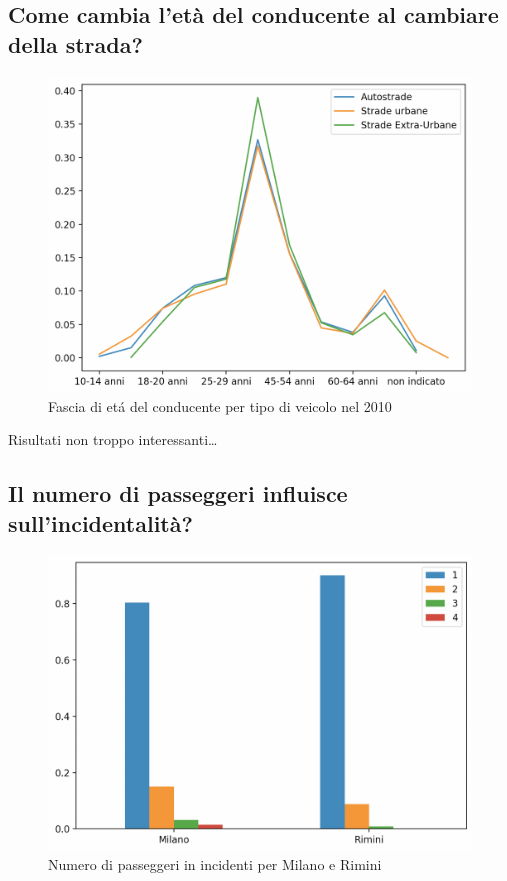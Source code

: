 \documentclass[a4paper]{report}
\begin{document}
\subsection{Come cambia l'età del conducente al cambiare della strada?}

\begin{figure}
    \includegraphics[width=\linewidth]{../src/incidenti/incidenti_senza_coords/tipo_veicoli/differenza_eta.png}
    \caption{Fascia di et\'a del conducente per tipo di veicolo nel 2010}
    \label{fig:differenza_eta}
\end{figure}



Risultati non troppo interessanti\dots


\subsection{Il numero di passeggeri influisce sull'incidentalità?}

\begin{figure}
    \includegraphics[width=\linewidth]{../src/incidenti/incidenti_senza_coords/tipo_veicoli/passeggeri.png}
    \caption{Numero di passeggeri in incidenti per Milano e Rimini}
    \label{fig:passeggeri_milano_rimini}
\end{figure}
\end{document}
